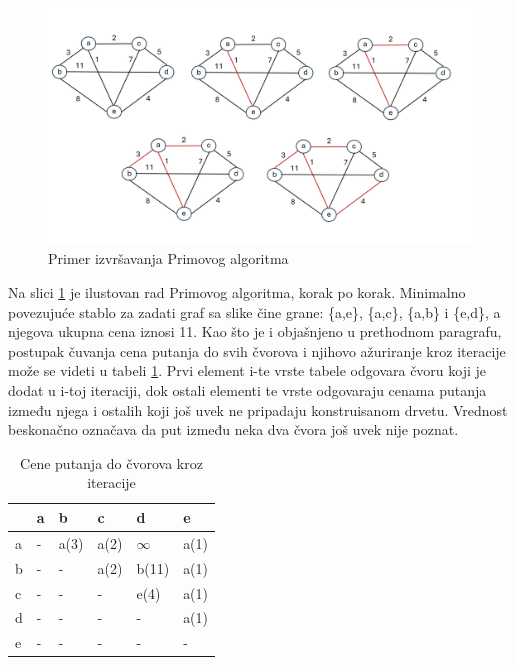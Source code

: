 \documentclass[12pt,oneside]{memoir}
\begin{document}
\begin{figure}[!ht]
  \centering
  \label{fig:Prim}
  \includegraphics[width=1.0\textwidth]{matfmaster/PrimAlgo.png}
  \caption{Primer izvršavanja Primovog algoritma}
\end{figure}

Na slici \ref{fig:Prim} je ilustovan rad Primovog algoritma, korak po korak. Minimalno povezujuće stablo za zadati graf sa slike čine grane: \{a,e\}, \{a,c\}, \{a,b\} i \{e,d\}, a njegova ukupna cena iznosi 11. Kao što je i objašnjeno u prethodnom paragrafu, postupak čuvanja cena putanja do svih čvorova i njihovo ažuriranje kroz iteracije može se videti u tabeli \ref{tbl:Prim}. Prvi element i-te vrste tabele odgovara čvoru koji je dodat u i-toj iteraciji, dok ostali elementi te vrste odgovaraju cenama putanja između njega i ostalih koji još uvek ne pripadaju konstruisanom drvetu. Vrednost beskonačno označava da put između neka dva čvora još uvek nije poznat.\\

\begin{table}[h]
\centering
\label{tbl:Prim}
\begin{tabular}{|>{\centering}p{0.8cm}|>{\centering}p{0.8cm}|>{\centering}p{0.8cm}|>{\centering}p{0.8cm}|>{\centering}p{0.8cm}|>{\centering\arraybackslash}p{0.8cm}|}
\hline
 & a & b & c & d & e \\
\hline
a & - & a(3) & a(2) & \( \infty \) & a(1) \\
\hline
b & - & - & a(2) & b(11) & a(1) \\
\hline
c & - & - & - & e(4) & a(1) \\
\hline
d & - & - & - & - & a(1) \\
\hline
e & - & - & - & - & - \\
\hline
\end{tabular}
\caption{Cene putanja do čvorova kroz iteracije}
\end{table}
\end{document}

